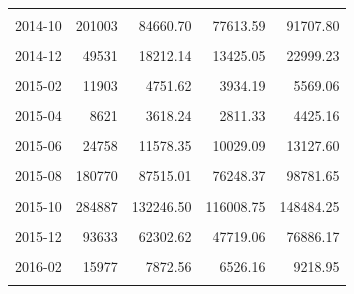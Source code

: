 \begin{longtable}[t]{crrrr}
\cellcolor{gray!10}{2014-09} & \cellcolor{gray!10}{220178} & \cellcolor{gray!10}{92878.82} & \cellcolor{gray!10}{71859.07} & \cellcolor{gray!10}{113898.57}\\
2014-10 & 201003 & 84660.70 & 77613.59 & 91707.80\\
\cellcolor{gray!10}{2014-11} & \cellcolor{gray!10}{86924} & \cellcolor{gray!10}{31029.12} & \cellcolor{gray!10}{25278.16} & \cellcolor{gray!10}{36780.07}\\
2014-12 & 49531 & 18212.14 & 13425.05 & 22999.23\\
\cellcolor{gray!10}{2015-01} & \cellcolor{gray!10}{26195} & \cellcolor{gray!10}{10802.66} & \cellcolor{gray!10}{7609.64} & \cellcolor{gray!10}{13995.69}\\
2015-02 & 11903 & 4751.62 & 3934.19 & 5569.06\\
\cellcolor{gray!10}{2015-03} & \cellcolor{gray!10}{7144} & \cellcolor{gray!10}{1078.94} & \cellcolor{gray!10}{-1362.18} & \cellcolor{gray!10}{3520.07}\\
2015-04 & 8621 & 3618.24 & 2811.33 & 4425.16\\
\cellcolor{gray!10}{2015-05} & \cellcolor{gray!10}{8933} & \cellcolor{gray!10}{3782.10} & \cellcolor{gray!10}{2382.59} & \cellcolor{gray!10}{5181.60}\\
2015-06 & 24758 & 11578.35 & 10029.09 & 13127.60\\
\cellcolor{gray!10}{2015-07} & \cellcolor{gray!10}{43082} & \cellcolor{gray!10}{18137.55} & \cellcolor{gray!10}{16793.44} & \cellcolor{gray!10}{19481.65}\\
2015-08 & 180770 & 87515.01 & 76248.37 & 98781.65\\
\cellcolor{gray!10}{2015-09} & \cellcolor{gray!10}{323070} & \cellcolor{gray!10}{173685.40} & \cellcolor{gray!10}{152490.44} & \cellcolor{gray!10}{194880.36}\\
2015-10 & 284887 & 132246.50 & 116008.75 & 148484.25\\
\cellcolor{gray!10}{2015-11} & \cellcolor{gray!10}{139755} & \cellcolor{gray!10}{67707.48} & \cellcolor{gray!10}{55105.90} & \cellcolor{gray!10}{80309.06}\\
2015-12 & 93633 & 62302.62 & 47719.06 & 76886.17\\
\cellcolor{gray!10}{2016-01} & \cellcolor{gray!10}{29471} & \cellcolor{gray!10}{12777.83} & \cellcolor{gray!10}{8739.75} & \cellcolor{gray!10}{16815.91}\\
2016-02 & 15977 & 7872.56 & 6526.16 & 9218.95\\
\cellcolor{gray!10}{2016-03} & \cellcolor{gray!10}{14582} & \cellcolor{gray!10}{9910.50} & \cellcolor{gray!10}{7895.25} & \cellcolor{gray!10}{11925.76}\\

\end{longtable}
